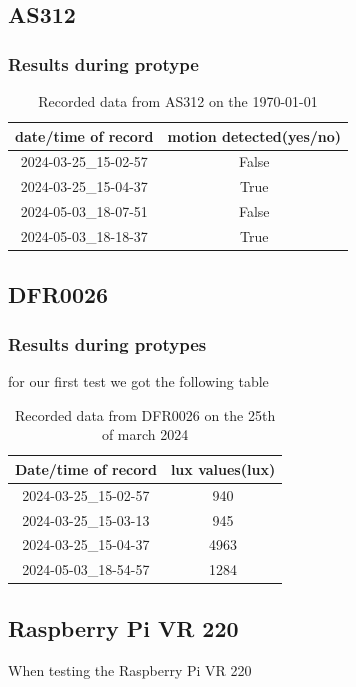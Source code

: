\subsection{AS312}
\subsubsection{Results during protype}
\begin{table}[h!]
    \centering
    \begin{tabular}{|c|c|}
        \hline
        date/time of record & motion detected(yes/no)\\
        \hline \hline
        2024-03-25_15-02-57&False \\
        2024-03-25_15-04-37&True\\
        2024-05-03_18-07-51&False\\
        2024-05-03_18-18-37&True\\
        \hline
    \end{tabular}
    \caption{Recorded data from  AS312 on the \today}
    \label{Recorded data from  AS312 on the \today}
\end{table}
\subsection{DFR0026}
\subsubsection{Results during protypes}
for our first test we got  the following  table 
\begin{table}[h!]
    \centering
    \begin{tabular}{|c|c|}
        \hline
        Date/time of record & lux values(lux)\\
        \hline \hline
        2024-03-25_15-02-57&940\\
        2024-03-25_15-03-13&945\\
        2024-03-25_15-04-37&4963\\
        2024-05-03_18-54-57&1284
        \hline
    \end{tabular}
    \caption{Recorded data from DFR0026 on the 25th of march 2024}
    \label{Recorded data from DFR0026 on the 25th of march 2024}
\end{table}
\newpage
\subsection{Raspberry Pi VR 220}
When testing  the Raspberry Pi VR 220
